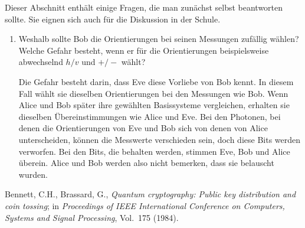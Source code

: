 Dieser Abschnitt enth\"alt einige Fragen, die man zun\"achst selbst beantworten sollte.
Sie eignen sich auch f\"ur die Diskussion in der Schule.

\begin{enumerate}
\item
Weshalb sollte Bob die Orientierungen bei seinen Messungen zuf\"allig w\"ahlen?
Welche Gefahr besteht, wenn er f\"ur die Orientierungen beispielsweise abwechselnd
$h/v$ und $+/-$ w\"ahlt?

Die Gefahr besteht darin, dass Eve diese Vorliebe von Bob kennt. In diesem Fall w\"ahlt
sie dieselben Orientierungen bei den Messungen wie Bob. Wenn Alice und Bob sp\"ater ihre
gew\"ahlten Basissysteme vergleichen, erhalten sie dieselben \"Ubereinstimmungen wie Alice und
Eve. Bei den Photonen, bei denen die Orientierungen von Eve und Bob sich von denen von Alice
unterscheiden, k\"onnen die Messwerte verschieden sein, doch diese Bits werden verworfen. Bei den
Bits, die behalten werden, stimmen Eve, Bob und Alice \"uberein. Alice und Bob werden also nicht
bemerken, dass sie belauscht wurden.



\end{enumerate}


\begin{thebibliography}{99}
 Bennett, C.H., Brassard, G., \textit{Quantum cryptography: Public
        key distribution and coin tossing}; in \textit{Proceedings of IEEE International
        Conference on Computers, Systems and Signal Processing}, Vol.\ 175 (1984).       
\end{thebibliography}


%

